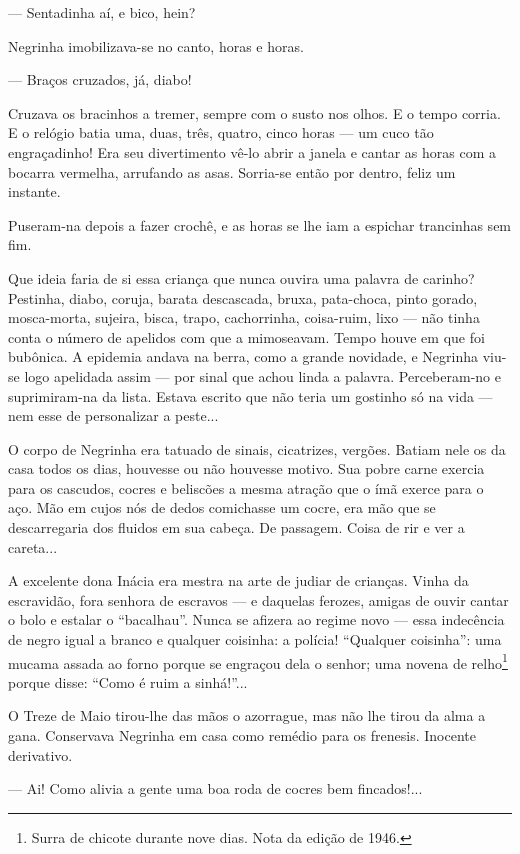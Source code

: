 --- Sentadinha aí, e bico, hein?

Negrinha imobilizava-se no canto, horas e horas.

--- Braços cruzados, já, diabo!

Cruzava os bracinhos a tremer, sempre com o susto nos olhos. E o tempo
corria. E o relógio batia uma, duas, três, quatro, cinco horas --- um
cuco tão engraçadinho! Era seu divertimento vê-lo abrir a janela e
cantar as horas com a bocarra vermelha, arrufando as asas. Sorria-se
então por dentro, feliz um instante.

Puseram-na depois a fazer crochê, e as horas se lhe iam a espichar
trancinhas sem fim.

Que ideia faria de si essa criança que nunca ouvira uma palavra de
carinho? Pestinha, diabo, coruja, barata descascada, bruxa, pata-choca,
pinto gorado, mosca-morta, sujeira, bisca, trapo, cachorrinha,
coisa-ruim, lixo --- não tinha conta o número de apelidos com que a
mimoseavam. Tempo houve em que foi bubônica. A epidemia andava na berra,
como a grande novidade, e Negrinha viu-se logo apelidada assim --- por
sinal que achou linda a palavra. Perceberam-no e suprimiram-na da lista.
Estava escrito que não teria um gostinho só na vida --- nem esse de
personalizar a peste...

O corpo de Negrinha era tatuado de sinais, cicatrizes, vergões. Batiam
nele os da casa todos os dias, houvesse ou não houvesse motivo. Sua
pobre carne exercia para os cascudos, cocres e beliscões a mesma atração
que o ímã exerce para o aço. Mão em cujos nós de dedos comichasse um
cocre, era mão que se descarregaria dos fluidos em sua cabeça. De
passagem. Coisa de rir e ver a careta...

A excelente dona Inácia era mestra na arte de judiar de crianças. Vinha
da escravidão, fora senhora de escravos --- e daquelas ferozes, amigas
de ouvir cantar o bolo e estalar o ``bacalhau''. Nunca se afizera ao
regime novo --- essa indecência de negro igual a branco e qualquer
coisinha: a polícia! ``Qualquer coisinha'': uma mucama assada ao forno
porque se engraçou dela o senhor; uma novena de relho\footnote{Surra de
  chicote durante nove dias. Nota da edição de 1946.} porque disse:
``Como é ruim a sinhá!''...

O Treze de Maio tirou-lhe das mãos o azorrague, mas não lhe tirou da
alma a gana. Conservava Negrinha em casa como remédio para os frenesis.
Inocente derivativo.

--- Ai! Como alivia a gente uma boa roda de cocres bem fincados!...

